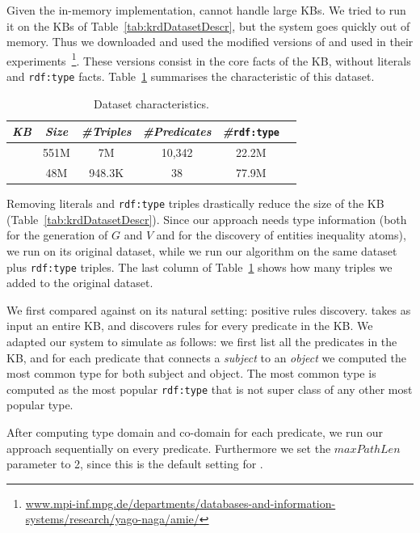 Given the in-memory implementation, \amie cannot handle large KBs. We tried to run it on the KBs of Table~\ref{tab:krdDatasetDescr}, but the system goes quickly out of memory. Thus we downloaded and used the modified versions of \yago and \dbpedia used in their experiments~\footnote{\url{www.mpi-inf.mpg.de/departments/databases-and-information-systems/research/yago-naga/amie/}}. These versions consist in the core facts of the KB, without literals and \texttt{rdf:type} facts. Table~\ref{tab:AmieDatasetDescr} summarises the characteristic of this dataset.

\begin{table}[htb]
	\centering
	\caption{\amie Dataset characteristics.}
	\label{tab:AmieDatasetDescr}
	\begin{small}
		\begin{tabular}{|c|c|c|c|c|c|}
			\hline
			\hline
			{\it KB}&{\it Size}&{\it  \#Triples}&{\it \#Predicates}&{\it \#}\texttt{rdf:type}\tabularnewline
			\hline
			\dbpedia & 551M & 7M & 10,342 & 22.2M \tabularnewline
			\yago & 48M & 948.3K & 38 & 77.9M  \tabularnewline
			\hline
		\end{tabular}
	\end{small}
\end{table}

Removing literals and \texttt{rdf:type} triples drastically reduce the size of the KB (Table~\ref{tab:krdDatasetDescr}). Since our approach needs type information (both for the generation of $G$ and $V$ and for the discovery of entities inequality atoms), we run \amie on its original dataset, while we run our algorithm on the same dataset plus \texttt{rdf:type} triples. The last column of Table~\ref{tab:AmieDatasetDescr} shows how many triples we added to the original \amie dataset.

 We first compared \krd against \amie on its natural setting: positive rules discovery. \amie takes as input an entire KB, and discovers rules for every predicate in the KB. We adapted our system to simulate \amie as follows: we first list all the predicates in the KB, and for each predicate that connects a \emph{subject} to an \emph{object} we computed the most common type for both subject and object. The most common type is computed as the most popular \texttt{rdf:type} that is not super class of any other most popular type. 

After computing type domain and co-domain for each predicate, we run our approach sequentially on every predicate. Furthermore we set the $maxPathLen$ parameter to 2, since this is the default setting for \amie.

